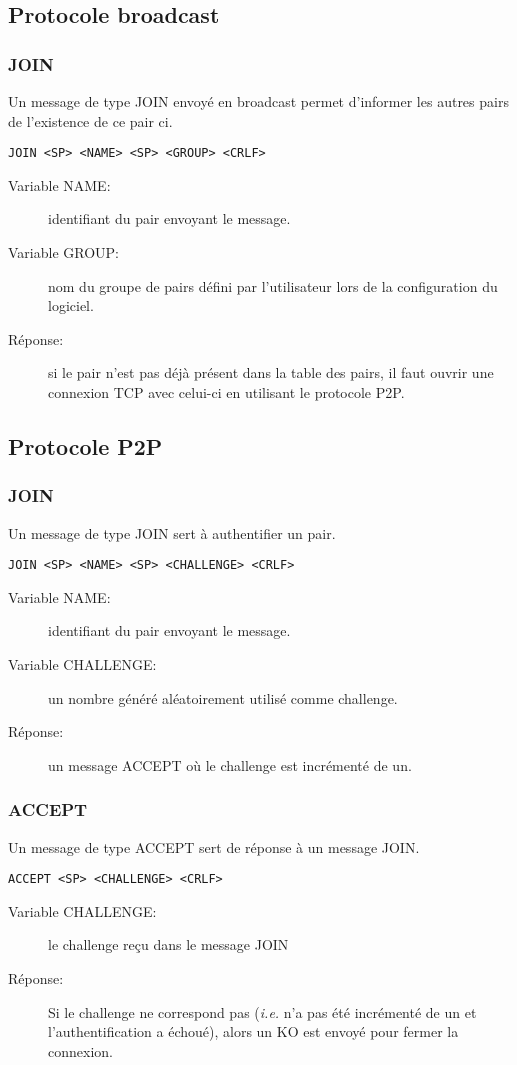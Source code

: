 \subsection{Protocole broadcast}
\subsubsection*{JOIN}
Un message de type JOIN envoyé en broadcast permet d'informer les autres
pairs de l'existence de ce pair ci.
\begin{verbatim}
JOIN <SP> <NAME> <SP> <GROUP> <CRLF>
\end{verbatim}
\begin{description}
\item[Variable NAME:] identifiant du pair envoyant le message.
\item[Variable GROUP:] nom du groupe de pairs défini par l'utilisateur
  lors de la configuration du logiciel.
\item[Réponse:] si le pair n'est pas déjà présent dans la table des pairs,
  il faut ouvrir une connexion TCP avec celui-ci en utilisant le protocole P2P.
\end{description}

\subsection{Protocole P2P}
\subsubsection*{JOIN}
Un message de type JOIN sert à authentifier un pair.
\begin{verbatim}
JOIN <SP> <NAME> <SP> <CHALLENGE> <CRLF>
\end{verbatim}
\begin{description}
\item[Variable NAME:] identifiant du pair envoyant le message.
\item[Variable CHALLENGE:] un nombre généré aléatoirement utilisé comme
  challenge.
\item[Réponse:] un message ACCEPT où le challenge est incrémenté de un.
\end{description}

\hrulefill

\subsubsection*{ACCEPT}
Un message de type ACCEPT sert de réponse à un message JOIN.
\begin{verbatim}
ACCEPT <SP> <CHALLENGE> <CRLF>
\end{verbatim}
\begin{description}
\item[Variable CHALLENGE:] le challenge reçu dans le message JOIN
\item[Réponse:] Si le challenge ne correspond pas (\emph{i.e.} n'a pas été
  incrémenté de un et l'authentification a échoué), alors un KO est envoyé
  pour fermer la con\-ne\-xion.
\end{description}

